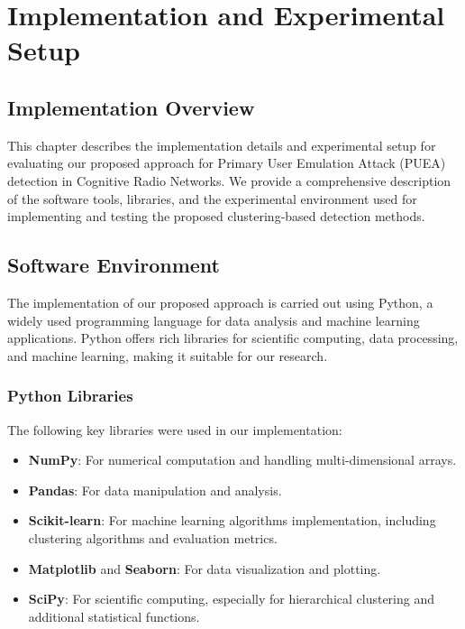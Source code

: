 \chapter{Implementation and Experimental Setup}

\section{Implementation Overview}
This chapter describes the implementation details and experimental setup for evaluating our proposed approach for Primary User Emulation Attack (PUEA) detection in Cognitive Radio Networks. We provide a comprehensive description of the software tools, libraries, and the experimental environment used for implementing and testing the proposed clustering-based detection methods.

\section{Software Environment}
The implementation of our proposed approach is carried out using Python, a widely used programming language for data analysis and machine learning applications. Python offers rich libraries for scientific computing, data processing, and machine learning, making it suitable for our research.

\subsection{Python Libraries}
The following key libraries were used in our implementation:

\begin{itemize}
    \item \textbf{NumPy}: For numerical computation and handling multi-dimensional arrays.
    \item \textbf{Pandas}: For data manipulation and analysis.
    \item \textbf{Scikit-learn}: For machine learning algorithms implementation, including clustering algorithms and evaluation metrics.
    \item \textbf{Matplotlib} and \textbf{Seaborn}: For data visualization and plotting.
    \item \textbf{SciPy}: For scientific computing, especially for hierarchical clustering and additional statistical functions.
\end{itemize}

